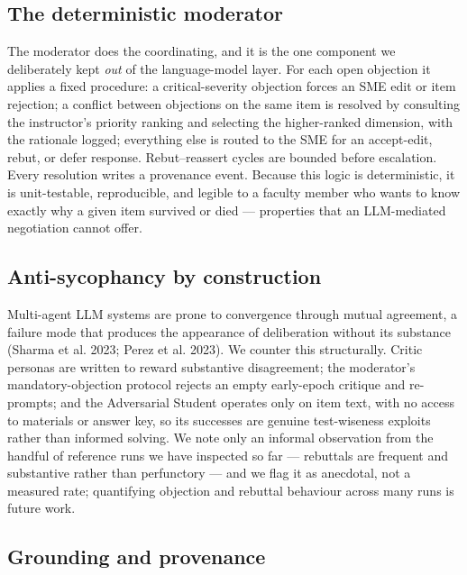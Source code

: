 \documentclass[
  11pt,
  letterpaper,
]{article}
\begin{document}
\subsection{The deterministic
moderator}\label{the-deterministic-moderator}

The moderator does the coordinating, and it is the one component we
deliberately kept \emph{out} of the language-model layer. For each open
objection it applies a fixed procedure: a critical-severity objection
forces an SME edit or item rejection; a conflict between objections on
the same item is resolved by consulting the instructor's priority
ranking and selecting the higher-ranked dimension, with the rationale
logged; everything else is routed to the SME for an accept-edit, rebut,
or defer response. Rebut--reassert cycles are bounded before escalation.
Every resolution writes a provenance event. Because this logic is
deterministic, it is unit-testable, reproducible, and legible to a
faculty member who wants to know exactly why a given item survived or
died --- properties that an LLM-mediated negotiation cannot offer.

\subsection{Anti-sycophancy by
construction}\label{anti-sycophancy-by-construction}

Multi-agent LLM systems are prone to convergence through mutual
agreement, a failure mode that produces the appearance of deliberation
without its substance ({Sharma et al.} 2023; {Perez et al.} 2023). We
counter this structurally. Critic personas are written to reward
substantive disagreement; the moderator's mandatory-objection protocol
rejects an empty early-epoch critique and re-prompts; and the
Adversarial Student operates only on item text, with no access to
materials or answer key, so its successes are genuine test-wiseness
exploits rather than informed solving. We note only an informal
observation from the handful of reference runs we have inspected so far
--- rebuttals are frequent and substantive rather than perfunctory ---
and we flag it as anecdotal, not a measured rate; quantifying objection
and rebuttal behaviour across many runs is future work.

\subsection{Grounding and provenance}\label{grounding-and-provenance}
\end{document}
